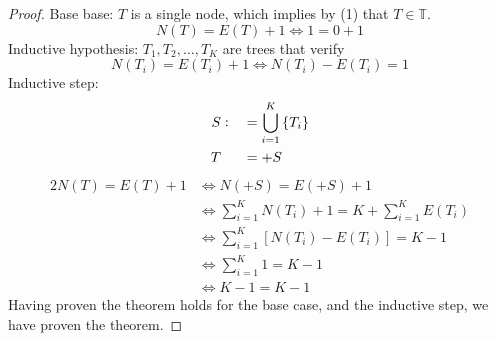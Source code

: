 \begin{proof}
Base base: $T$ is a single node, which implies by (1) that $T\in\mathbb{T}$.
\begin{equation*}
N(T)=E(T)+1 \iff 1=0+1
\end{equation*}
Inductive hypothesis: $T_1,T_2,\ldots,T_K$ are trees that verify
\begin{equation*}
N(T_i)=E(T_i)+1 \iff N(T_i)-E(T_i)=1
\end{equation*}
Inductive step:
\begin{alignat*}{2}
S&\vcentcolon&&=\bigcup_{i=1}^{K}{\{T_i\}}\\
T& &&=+S
\end{alignat*}
\begin{alignat*}{2}
N(T)=E(T)+1 &\iff N(+S)                          =E(+S)+1 \\
            &\iff \sum_{i=1}^{K}{N(T_i)}+1       =K+\sum_{i=1}^{K}{E(T_i)} \\
            &\iff \sum_{i=1}^{K}{[N(T_i)-E(T_i)]}=K-1 \\
            &\iff \sum_{i=1}^{K}{1}              =K-1 \\
            &\iff K-1                            =K-1
\end{alignat*}
Having proven the theorem holds for the base case, and the inductive step, we have proven the theorem.
\end{proof}
\pagebreak
